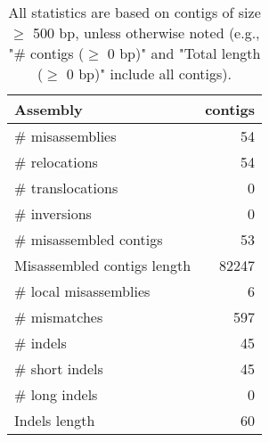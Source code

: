 \documentclass[12pt,a4paper]{article}
\begin{document}
\begin{table}[ht]
\begin{center}
\caption{All statistics are based on contigs of size $\geq$ 500 bp, unless otherwise noted (e.g., "\# contigs ($\geq$ 0 bp)" and "Total length ($\geq$ 0 bp)" include all contigs).}
\begin{tabular}{|l*{1}{|r}|}
\hline
Assembly & contigs \\ \hline
\# misassemblies & 54 \\ \hline
\hspace{5mm}\# relocations & 54 \\ \hline
\hspace{5mm}\# translocations & 0 \\ \hline
\hspace{5mm}\# inversions & 0 \\ \hline
\# misassembled contigs & 53 \\ \hline
Misassembled contigs length & 82247 \\ \hline
\# local misassemblies & 6 \\ \hline
\# mismatches & 597 \\ \hline
\# indels & 45 \\ \hline
\hspace{5mm}\# short indels & 45 \\ \hline
\hspace{5mm}\# long indels & 0 \\ \hline
Indels length & 60 \\ \hline
\end{tabular}
\end{center}
\end{table}
\end{document}
